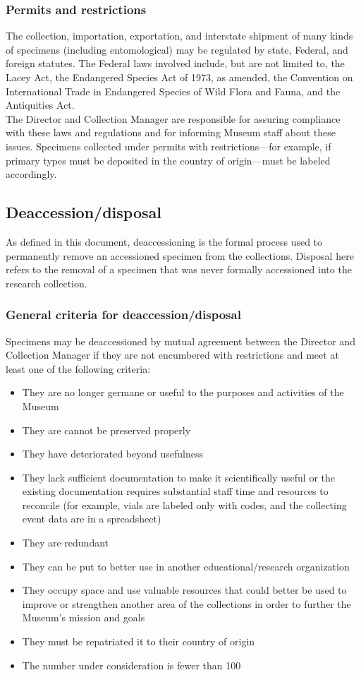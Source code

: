 \documentclass[letterpaper, 11pt]{article}
\begin{document}
\subsubsection{Permits and restrictions}
The collection, importation, exportation, and interstate shipment of many kinds of specimens (including entomological) may be regulated by state, Federal, and foreign statutes. The Federal laws involved include, but are not limited to, the Lacey Act, the Endangered Species Act of 1973, as amended, the Convention on International Trade in Endangered Species of Wild Flora and Fauna, and the Antiquities Act.\\

\noindent{}The Director and Collection Manager are responsible for assuring compliance with these laws and regulations and for informing Museum staff about these issues. Specimens collected under permits with restrictions---for example, if primary types must be deposited in the country of origin---must be labeled accordingly. 

\subsection{Deaccession/disposal}
As defined in this document, deaccessioning is the formal process used to permanently remove an accessioned specimen from the collections. Disposal here refers to the removal of a specimen that was never formally accessioned into the research collection.

\subsubsection{General criteria for deaccession/disposal}
Specimens may be deaccessioned by mutual agreement between the Director and Collection Manager if they are not encumbered with restrictions and meet at least one of the following criteria:
\begin{itemize}
\item They are no longer germane or useful to the purposes and activities of the Museum
\item They are cannot be preserved properly
\item They have deteriorated beyond usefulness
\item They lack sufficient documentation to make it scientifically useful or the existing documentation requires substantial staff time and resources to reconcile (for example, vials are labeled only with codes, and the collecting event data are in a spreadsheet)
\item They are redundant
\item They can be put to better use in another educational/research organization
\item They occupy space and use valuable resources that could better be used to improve or strengthen another area of the collections in order to further the Museum's mission and goals
\item They must be repatriated it to their country of origin
\item The number under consideration is fewer than 100
\end{itemize}
\end{document}
